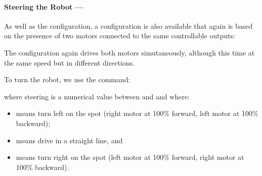 \documentclass[letterpaper,10pt,english]{sphinxmanual}
\begin{document}


\paragraph{Steering the Robot — }
\label{\detokenize{content/01_Robot_Lab/Section_00_01:Steering-the-Robot-_u2014-MoveSteering}}
As well as the  configuration, a  configuration is also available that again is based on the presence of two motors connected to the same controllable outputs:

\begin{sphinxVerbatim}[commandchars=\\\{\}]
   
\end{sphinxVerbatim}

The  configuration again drives both motors simutaneously, although this time at the same speed but in different directions.

To turn the robot, we use the command:

\begin{sphinxVerbatim}[commandchars=\\\{\}]
 
\end{sphinxVerbatim}

where steering is a numerical value between  and  and where:
\begin{itemize}
\item {} 
 means turn left on the spot (right motor at 100\% forward, left motor at 100\% backward);

\item {} 
 means drive in a straight line, and

\item {} 
 means turn right on the spot (left motor at 100\% forward, right motor at 100\% backward).

\end{itemize}
\end{document}

